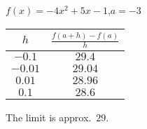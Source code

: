 {$\displaystyle f(x) = -4x^2+5x-1$,\quad  $a=-3$}
{\begin{tabular}{cc}
$h$ & $\frac{f(a+h)-f(a)}{h}$\\ \hline 
 $-0.1$ & $29.4$ \\
 $-0.01$ & $29.04$ \\
 $0.01$ & $28.96$ \\
 $0.1$ & $28.6$
\end{tabular}
The limit is approx.\ $29$.
}
